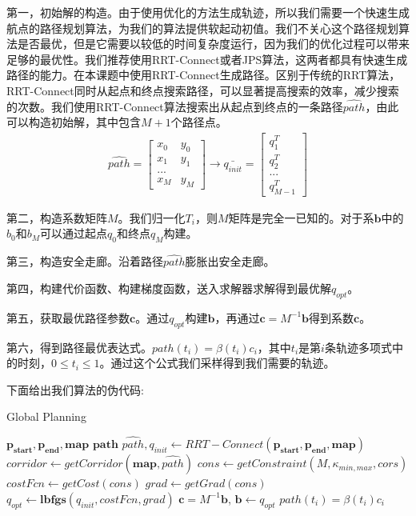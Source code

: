 \documentclass[master,academic]{ysuthesis} %
\begin{document}
		第一，初始解的构造。由于使用优化的方法生成轨迹，所以我们需要一个快速生成航点的路径规划算法，为我们的算法提供软起动初值。我们不关心这个路径规划算法是否最优，但是它需要以较低的时间复杂度运行，因为我们的优化过程可以带来足够的最优性。我们推荐使用RRT-Connect或者JPS算法，这两者都具有快速生成路径的能力。在本课题中使用RRT-Connect生成路径。区别于传统的RRT算法，RRT-Connect同时从起点和终点搜索路径，可以显著提高搜索的效率，减少搜索的次数。我们使用RRT-Connect算法搜索出从起点到终点的一条路径$\hat{path}$，由此可以构造初始解，其中包含$M+1$个路径点。
		\begin{equation}
			\begin{aligned}
				\hat{path} = \begin{bmatrix}
					x_0 &y_0\\
					x_1&y_1\\
					...\\
					x_M& y_M
				\end{bmatrix} \longrightarrow \bar{q_{init}}
				=\begin{bmatrix}
					q^T_1\\
					q^T_2\\
					...\\
					q^T_{M-1}
				\end{bmatrix}
			\end{aligned}
		\end{equation}

		第二，构造系数矩阵$M$。我们归一化$T_i$，则$M$矩阵是完全一已知的。对于系$\mathbf{b}$中的$b_0$和$b_M$可以通过起点$q_0$和终点$q_M$构建。
		
		第三，构造安全走廊。沿着路径$\hat{path}$膨胀出安全走廊。

		第四，构建代价函数、构建梯度函数，送入求解器求解得到最优解$q_{opt}$。

		第五，获取最优路径参数$\mathbf{c}$。通过$q_{opt}$构建$\mathbf{b}$，再通过$\mathbf{c} = M^{-1}\mathbf{b}$得到系数$\mathbf{c}$。

		第六，得到路径最优表达式。$path(t_i)=\beta(t_i)c_i$，其中$t_i$是第$i$条轨迹多项式中的时刻，$0 \le t_i \le 1$。通过这个公式我们采样得到我们需要的轨迹。
		
		下面给出我们算法的伪代码:
		 \begin{algorithm}[H]  
		 	\caption{Global Planning}  
		 	\label{alg:global_planning}  
		 	\begin{algorithmic}[1]  
		 		\REQUIRE  
		 		$\mathbf{p_{start}},\mathbf{p_{end}},\mathbf{map}$
		 		\ENSURE  
		 		$\mathbf{path}$
		 		\STATE $\hat{path},q_{init} \leftarrow RRT-Connect(\mathbf{p_{start}},\mathbf{p_{end}},\mathbf{map})$
		 		\STATE $corridor \leftarrow getCorridor(\mathbf{map},\hat{path})$
		 		\STATE $cons \leftarrow getConstraint(M,\kappa_{min,max},cors)$
		 		\STATE $costFcn \leftarrow getCost(cons)$
		 		\STATE $grad \leftarrow getGrad(cons)$ \\
		 		\STATE $q_{opt} \leftarrow \mathbf{lbfgs}(q_{init},costFcn,grad)$
				\STATE $\mathbf{c} = M^{-1}\mathbf{b}$, $\mathbf{b} \longleftarrow q_{opt}$
				\RETURN $path(t_i)=\beta(t_i)c_i$
		 	\end{algorithmic}  
		 \end{algorithm}
		
\end{document}
